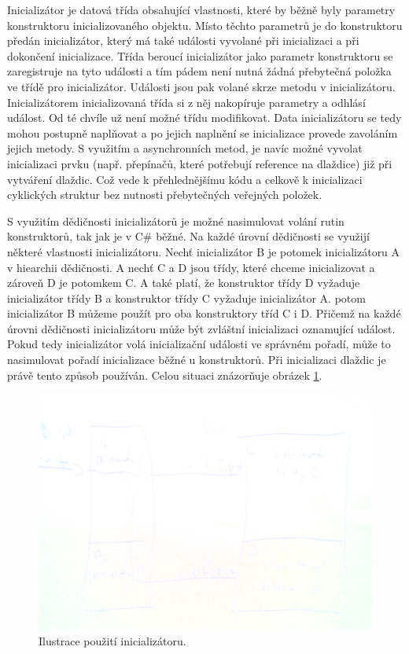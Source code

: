 Inicializátor je datová třída obsahující vlastnosti, které by běžně byly parametry konstruktoru inicializovaného objektu.
Místo těchto parametrů je do konstruktoru předán inicializátor, který má také události vyvolané
při inicializaci a při dokončení inicializace. Třída beroucí inicializátor jako parametr konstruktoru se zaregistruje na tyto události a
tím pádem není nutná žádná přebytečná položka ve třídě pro inicializátor. Události jsou pak volané skrze metodu v inicializátoru.
Inicializátorem inicializovaná třída si z něj nakopíruje parametry a odhlásí událost. Od té chvíle už není možné třídu modifikovat.
Data inicializátoru se tedy mohou postupně naplňovat a po jejich naplnění se inicializace provede zavoláním jejich metody.
S využitím a asynchronních metod, je navíc možné vyvolat inicializaci prvku (např. přepínačů, které potřebují reference na dlaždice) 
již při vytváření dlaždic. Což vede k přehlednějšímu kódu a celkově k inicializaci cyklických struktur bez nutnosti přebytečných 
veřejných položek. 

S využitím dědičnosti inicializátorů je možné nasimulovat volání rutin konstruktorů, tak jak je v C\#  běžné. Na každé úrovní dědičnosti
se využijí některé vlastnosti inicializátoru. Nechť inicializátor B
je potomek inicializátoru A v hiearchii dědičnosti. A nechť C a D jsou třídy, které chceme inicializovat a zároveň D je potomkem C.
A také platí, že konstruktor třídy D vyžaduje inicializátor třídy B a konstruktor třídy C vyžaduje inicializátor A. potom inicializátor B můžeme
použít pro oba konstruktory tříd C i D. Přičemž na každé úrovni dědičnosti inicializátoru může být zvláštní inicializaci oznamující událost.
Pokud tedy inicializátor volá inicializační události ve správném pořadí, může to nasimulovat pořadí inicializace běžné u konstruktorů.
Při inicializaci dlaždic je právě tento způsob používán. Celou situaci znázorňuje obrázek \ref{initializer-inherence}.

\begin{figure}[H]\centering
\includegraphics[width=\textwidth]{./img/initializer-inherence.png}
\caption{Ilustrace použití inicializátoru.}
\label{initializer-inherence}
\end{figure}

